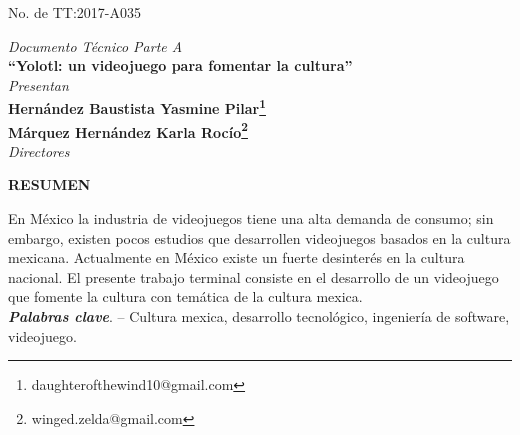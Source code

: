 	\begin{center}
	    
	    
\begin{multicols}{2} 
\raggedright{{\fontsize{14}{20} No. de TT:2017-A035}} 

\end{multicols}\vspace{1cm}

	    {\fontsize{14}{20} \textit{Documento Técnico Parte A}}\vspace{1cm}\\
	    {\fontsize{16}{20} \textbf{``Yolotl: un videojuego para fomentar la cultura''}}\vspace{1.5cm}\\
	    {\fontsize{14}{20} \textit{Presentan}}\\
	    {\fontsize{14}{20} \textbf{Hernández Baustista Yasmine Pilar\footnote{daughterofthewind10@gmail.com}}}\vspace{1cm}\\
	    {\fontsize{14}{20} \textbf{Márquez Hernández Karla Rocío\footnote{winged.zelda@gmail.com}}}\vspace{1cm}\\
	   
	   \fontsize{14}{20} \textit{Directores}\vspace{1.5cm}\\
	    
	    
{\fboxrule=0pt \fboxsep=12pt	    
}
\end{center}
\begin{center}
{\fontsize{14}{20} \textbf{RESUMEN}}
\end{center}
En México la industria de videojuegos tiene una alta demanda de consumo; sin embargo, existen pocos estudios que desarrollen videojuegos basados en la cultura mexicana. Actualmente en México existe un fuerte desinterés en la cultura nacional. El presente trabajo terminal consiste en el desarrollo de un videojuego que fomente la cultura con temática de la cultura mexica. 
\\
 
\textbf{\textit{Palabras clave}}. –  Cultura mexica, desarrollo tecnológico, ingeniería de software, videojuego.
